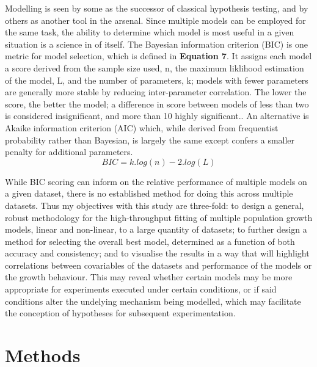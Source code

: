 \documentclass[11pt]{article}
\begin{document}
Modelling is seen by some as the successor of classical hypothesis testing, and by others as another tool in the arsenal.\parencite{Johnson2004} Since multiple models can be employed for the same task, the ability to determine which model is most useful in a given situation is a science in of itself. The Bayesian information criterion (BIC) is one metric for model selection, which is defined in \textbf{Equation 7}. It assigns each model a score derived from the sample size used, n, the maximum liklihood estimation of the model, L, and the number of parameters, k; models with fewer parameters are generally more stable by reducing inter-parameter correlation.\parencite{Akaike1974,Zwietering1990} The lower the score, the better the model; a difference in score between models of less than two is considered insignificant, and more than 10 highly significant.\parencite{Vrieze2012,Posada2004}. An alternative is Akaike information criterion (AIC) which, while derived from frequentist probability rather than Bayesian, is largely the same except confers a smaller penalty for additional parameters.\parencite{Posada2004} 
\begin{equation}
    BIC = k.log(n) - 2.log(L)
\end{equation}
\vspace{2mm}

\noindent While BIC scoring can inform on the relative performance of multiple models on a given dataset, there is no established method for doing this across multiple datasets. Thus my objectives with this study are three-fold: to design a general, robust methodology for the high-throughput fitting of multiple population growth models, linear and non-linear, to a large quantity of datasets; to further design a method for selecting the overall best model, determined as a function of both accuracy and consistency; and to visualise the results in a way that will highlight correlations between covariables of the datasets and performance of the models or the growth behaviour. This may reveal whether certain models may be more appropriate for experiments executed under certain conditions, or if said conditions alter the undelying mechanism being modelled, which may facilitate the conception of hypotheses for subsequent experimentation.



\vspace{5mm}
\section{Methods}%
\end{document}
